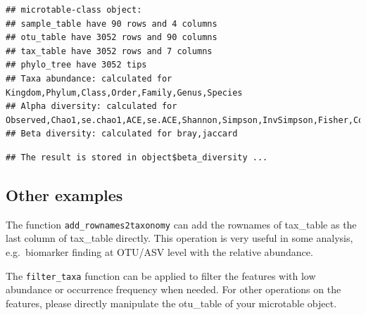 \documentclass[
]{book}
\newenvironment{Shaded}{\begin{snugshade}}{\end{snugshade}}
\newcommand{\AttributeTok}[1]{\textcolor[rgb]{0.77,0.63,0.00}{#1}}
\newcommand{\CommentTok}[1]{\textcolor[rgb]{0.56,0.35,0.01}{\textit{#1}}}
\newcommand{\FunctionTok}[1]{\textcolor[rgb]{0.00,0.00,0.00}{#1}}
\newcommand{\NormalTok}[1]{#1}
\newcommand{\OtherTok}[1]{\textcolor[rgb]{0.56,0.35,0.01}{#1}}
\newcommand{\SpecialCharTok}[1]{\textcolor[rgb]{0.00,0.00,0.00}{#1}}
\newcommand{\StringTok}[1]{\textcolor[rgb]{0.31,0.60,0.02}{#1}}
\begin{document}
\begin{verbatim}
## microtable-class object:
## sample_table have 90 rows and 4 columns
## otu_table have 3052 rows and 90 columns
## tax_table have 3052 rows and 7 columns
## phylo_tree have 3052 tips
## Taxa abundance: calculated for Kingdom,Phylum,Class,Order,Family,Genus,Species 
## Alpha diversity: calculated for Observed,Chao1,se.chao1,ACE,se.ACE,Shannon,Simpson,InvSimpson,Fisher,Coverage 
## Beta diversity: calculated for bray,jaccard
\end{verbatim}

\begin{Shaded}
\end{Shaded}

\begin{verbatim}
## The result is stored in object$beta_diversity ...
\end{verbatim}

\hypertarget{other-examples}{%
\subsection{Other examples}\label{other-examples}}

The function \texttt{add\_rownames2taxonomy} can add the rownames of tax\_table as the last column of tax\_table directly.
This operation is very useful in some analysis, e.g.~biomarker finding at OTU/ASV level with the relative abundance.

\begin{Shaded}
\end{Shaded}

The \texttt{filter\_taxa} function can be applied to filter the features with low abundance or occurrence frequency when needed.
For other operations on the features, please directly manipulate the otu\_table of your microtable object.
\end{document}
